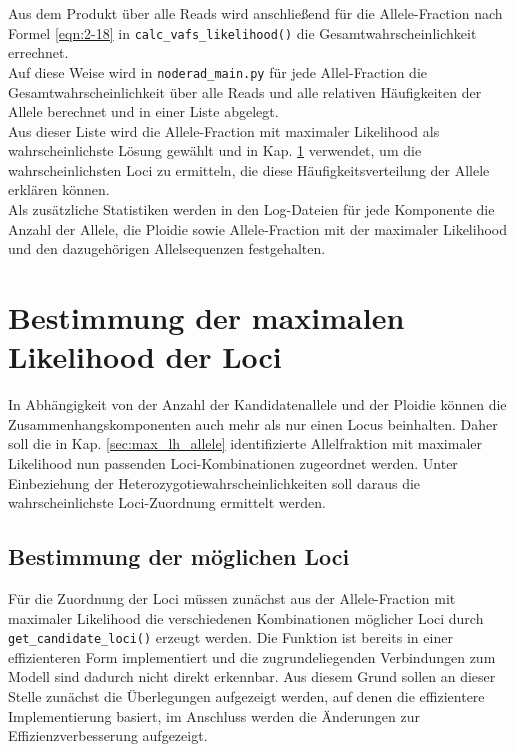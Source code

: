 Aus dem Produkt über alle Reads wird anschließend für die Allele-Fraction nach Formel \eqref{eqn:2-18} in \lstinline|calc_vafs_likelihood()| die Gesamtwahrscheinlichkeit errechnet. \\

Auf diese Weise wird in \lstinline|noderad_main.py| für jede Allel-Fraction die Gesamtwahrscheinlichkeit über alle Reads und alle relativen Häufigkeiten der Allele berechnet und in einer Liste abgelegt. \\

Aus dieser Liste wird die Allele-Fraction mit maximaler Likelihood als wahrscheinlichste Lösung gewählt und in Kap. \ref{sec:max_lh_loci} verwendet, um die wahrscheinlichsten Loci zu ermitteln, die diese Häufigkeitsverteilung der Allele erklären können.  \\

Als zusätzliche Statistiken werden in den Log-Dateien für jede Komponente die Anzahl der Allele, die Ploidie sowie Allele-Fraction mit der maximaler Likelihood und den dazugehörigen Allelsequenzen festgehalten.

\section{Bestimmung der maximalen Likelihood der Loci} \label{sec:max_lh_loci}

In Abhängigkeit von der Anzahl der Kandidatenallele und der Ploidie können die Zusammenhangskomponenten auch mehr als nur einen Locus beinhalten. Daher soll die in Kap. \ref{sec:max_lh_allele} identifizierte Allelfraktion mit maximaler Likelihood nun passenden Loci-Kombinationen zugeordnet werden. Unter Einbeziehung der Heterozygotiewahrscheinlichkeiten soll daraus die wahrscheinlichste Loci-Zuordnung ermittelt werden.

\subsection{Bestimmung der möglichen Loci} \label{subsec:comb_loci}

Für die Zuordnung der Loci müssen zunächst aus der Allele-Fraction mit maximaler Likelihood die  verschiedenen Kombinationen möglicher Loci durch \lstinline|get_candidate_loci()| erzeugt werden.
Die Funktion ist bereits in einer effizienteren Form implementiert und die zugrundeliegenden Verbindungen zum Modell sind dadurch nicht direkt erkennbar. Aus diesem Grund sollen an dieser Stelle zunächst die Überlegungen aufgezeigt werden, auf denen die effizientere Implementierung basiert, im Anschluss werden die Änderungen zur Effizienzverbesserung aufgezeigt. \\

